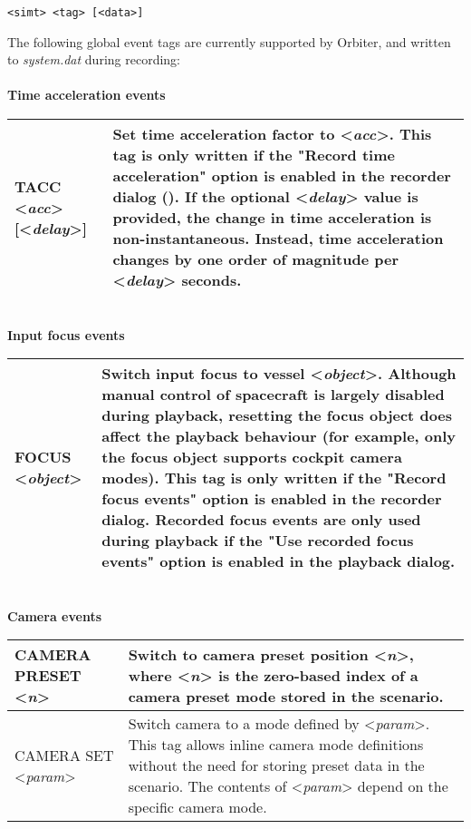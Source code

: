 \documentclass[Orbiter Technical Reference.tex]{subfiles}
\begin{document}
\begin{lstlisting}[language=OSFS]
<simt> <tag> [<data>]
\end{lstlisting}

\noindent
The following global event tags are currently supported by Orbiter, and written to \textit{system.dat} during recording:\\
\\
\textbf{Time acceleration events}

\begin{table}[H]
	\centering
	\begin{tabularx}{\textwidth}{ |l|X| }
	\hline\rule{0pt}{2ex}
	TACC <\textit{acc}> [<\textit{delay}>] & Set time acceleration factor to <\textit{acc}>. This tag is only written if  the "Record time acceleration" option is enabled in the recorder dialog (\Ctrl\keystroke{F5}). If the optional <\textit{delay}> value is provided, the change in time acceleration is non-instantaneous. Instead, time acceleration changes by one order of magnitude per <\textit{delay}> seconds.\\
	\hline
	\end{tabularx}
\end{table}

\noindent
\\
\textbf{Input focus events}

\begin{table}[H]
	\centering
	\begin{tabularx}{\textwidth}{ |l|X| }
	\hline\rule{0pt}{2ex}
	FOCUS <\textit{object}> & Switch input focus to vessel <\textit{object}>. Although manual control of spacecraft is largely disabled during playback, resetting the focus object does affect the playback behaviour (for example, only the focus object supports cockpit camera modes).\newline
	This tag is only written if the "Record focus events" option is enabled in the recorder dialog.\newline
	Recorded focus events are only used during playback if the "Use recorded focus events" option is enabled in the playback dialog.\\
	\hline
	\end{tabularx}
\end{table}

\noindent
\\
\textbf{Camera events}

\begin{table}[H]
	\centering
	\begin{tabularx}{\textwidth}{ |l|X| }
	\hline\rule{0pt}{2ex}
	CAMERA PRESET <\textit{n}> & Switch to camera preset position <\textit{n}>, where <\textit{n}> is the zero-based index of a camera preset mode stored in the scenario.\\
	\hline\rule{0pt}{2ex}
	CAMERA SET <\textit{param}> & Switch camera to a mode defined by <\textit{param}>. This tag allows inline camera mode definitions without the need for storing preset data in the scenario. The contents of <\textit{param}> depend on the specific camera mode.\\
	\hline
	\end{tabularx}
\end{table}
\end{document}
